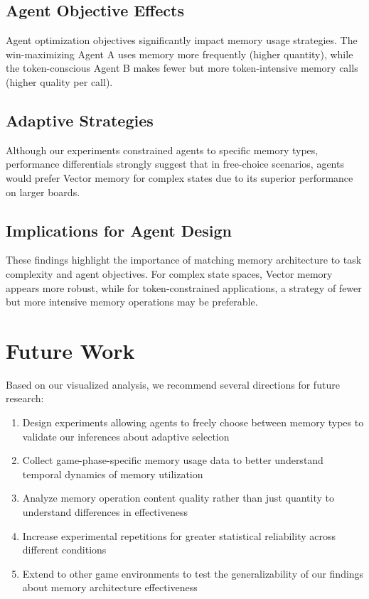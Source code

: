 \documentclass[10pt]{article}
\begin{document}
\subsection{Agent Objective Effects}
Agent optimization objectives significantly impact memory usage strategies. The win-maximizing Agent A uses memory more frequently (higher quantity), while the token-conscious Agent B makes fewer but more token-intensive memory calls (higher quality per call).

\subsection{Adaptive Strategies}
Although our experiments constrained agents to specific memory types, performance differentials strongly suggest that in free-choice scenarios, agents would prefer Vector memory for complex states due to its superior performance on larger boards.

\subsection{Implications for Agent Design}
These findings highlight the importance of matching memory architecture to task complexity and agent objectives. For complex state spaces, Vector memory appears more robust, while for token-constrained applications, a strategy of fewer but more intensive memory operations may be preferable.

\section{Future Work}
\small
Based on our visualized analysis, we recommend several directions for future research:

\begin{enumerate}[leftmargin=*,noitemsep]
    \item Design experiments allowing agents to freely choose between memory types to validate our inferences about adaptive selection
    \item Collect game-phase-specific memory usage data to better understand temporal dynamics of memory utilization
    \item Analyze memory operation content quality rather than just quantity to understand differences in effectiveness
    \item Increase experimental repetitions for greater statistical reliability across different conditions
    \item Extend to other game environments to test the generalizability of our findings about memory architecture effectiveness
\end{enumerate}
\end{document}
